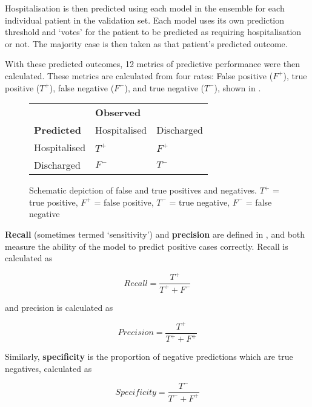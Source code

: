 Hospitalisation is then predicted using each model in the ensemble for each individual patient in the validation set. Each model uses its own prediction threshold and `votes' for the patient to be predicted as requiring hospitalisation or not. The majority case is then taken as that patient's predicted outcome.

With these predicted outcomes, 12 metrics of predictive performance were then calculated. These metrics are calculated from four rates: False positive ($F^+$), true positive ($T^+$), false negative ($F^-$), and true negative ($T^-$), shown in .

\begin{figure}[H]
    \renewcommand\arraystretch{1.2}
    \centering
    \begin{tabular}{l|ll}
	& \textbf{Observed} &\\
	\textbf{Predicted} & Hospitalised & Discharged\\
	\hline
	Hospitalised & \quad\quad$T^+$ & \quad\quad$F^+$\\
	Discharged & \quad\quad$F^-$ & \quad\quad$T^-$\\
    \end{tabular}
    \caption[Schematic depiction of false and true positives and negatives]{Schematic depiction of false and true positives and negatives. $T^+$ = true positive, $F^+$ = false positive, $T^-$ = true negative, $F^-$ = false negative}
    \label{tab:positivity-rates}
\end{figure}

\textbf{Recall} (sometimes termed `sensitivity') and \textbf{precision} are defined in , and both measure the ability of the model to predict positive cases correctly. Recall is calculated as

\begin{equation}
Recall = \frac{T^+}{T^+ + F^-}
\end{equation}

and precision is calculated as

\begin{equation}
Precision = \frac{T^+}{T^+ + F^+}
\end{equation}

Similarly, \textbf{specificity} is the proportion of negative predictions which are true negatives, calculated as

\begin{equation}
Specificity = \frac{T^-}{T^- + F^+}
\end{equation}

